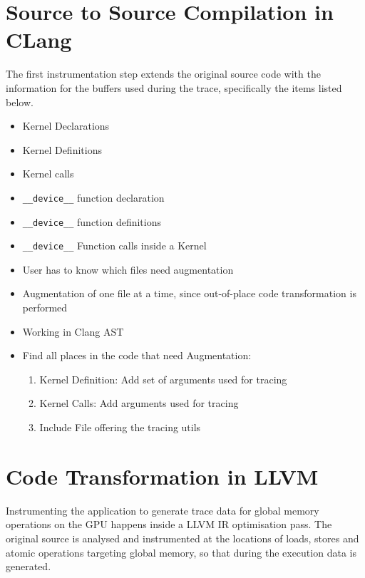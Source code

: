 \section{Source to Source Compilation in CLang}\label{sec:impl:clang}
The first instrumentation step extends the original source code with the information for the buffers used during the trace, specifically the items listed below.
\begin{itemize}
	\item Kernel Declarations
	\item Kernel Definitions
	\item Kernel calls
	\item \verb|__device__| function declaration
	\item \verb|__device__| function definitions
	\item \verb|__device__| Function calls inside a Kernel
\end{itemize}


\begin{itemize}
	\item User has to know which files need augmentation
	\item Augmentation of one file at a time, since out-of-place code transformation is performed
	\item Working in Clang AST
	\item Find all places in the code that need Augmentation:
	\begin{enumerate}
		\item Kernel Definition: Add set of arguments used for tracing
		\item Kernel Calls: Add arguments used for tracing
		\item Include File offering the tracing utils
	\end{enumerate}
\end{itemize}
\section{Code Transformation in LLVM}
Instrumenting the application to generate trace data for global memory operations on the GPU happens inside a LLVM IR optimisation pass. The original source is analysed and instrumented at the locations of loads, stores and atomic operations targeting global memory, so that during the execution data is generated.

